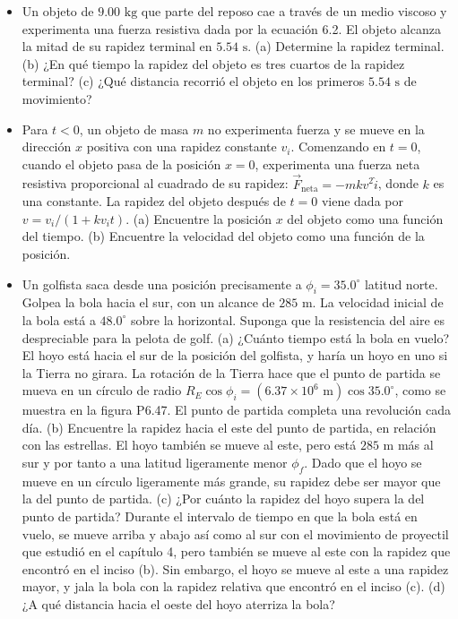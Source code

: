 \documentclass[11pt,a4paper]{article}
\begin{document}
\begin{itemize}
    \item[\textbf{45.}] Un objeto de $9.00 \text{ kg}$ que parte del reposo cae a través de un medio viscoso y experimenta una fuerza resistiva dada por la ecuación 6.2. El objeto alcanza la mitad de su rapidez terminal en $5.54 \text{ s}$. (a) Determine la rapidez terminal. (b) ¿En qué tiempo la rapidez del objeto es tres cuartos de la rapidez terminal? (c) ¿Qué distancia recorrió el objeto en los primeros $5.54 \text{ s}$ de movimiento?
    \vspace*{8cm}

    \item[\textbf{46.}] Para $t < 0$, un objeto de masa $m$ no experimenta fuerza y se mueve en la dirección $x$ positiva con una rapidez constante $v_i$. Comenzando en $t = 0$, cuando el objeto pasa de la posición $x = 0$, experimenta una fuerza neta resistiva proporcional al cuadrado de su rapidez: $\vec{F}_{\text{neta}} = -mkv^2 \hat{i}$, donde $k$ es una constante. La rapidez del objeto después de $t = 0$ viene dada por $v = v_i / (1 + kv_it)$. (a) Encuentre la posición $x$ del objeto como una función del tiempo. (b) Encuentre la velocidad del objeto como una función de la posición.
    \vspace*{7cm}

    \item[\textbf{47.}] Un golfista saca desde una posición precisamente a $\phi_i = 35.0^\circ$ latitud norte. Golpea la bola hacia el sur, con un alcance de $285 \text{ m}$. La velocidad inicial de la bola está a $48.0^\circ$ sobre la horizontal. Suponga que la resistencia del aire es despreciable para la pelota de golf. (a) ¿Cuánto tiempo está la bola en vuelo? El hoyo está hacia el sur de la posición del golfista, y haría un hoyo en uno si la Tierra no girara. La rotación de la Tierra hace que el punto de partida se mueva en un círculo de radio $R_E \cos\phi_i = (6.37 \times 10^6 \text{ m})\cos 35.0^\circ$, como se muestra en la figura P6.47. El punto de partida completa una revolución cada día. (b) Encuentre la rapidez hacia el este del punto de partida, en relación con las estrellas. El hoyo también se mueve al este, pero está $285 \text{ m}$ más al sur y por tanto a una latitud ligeramente menor $\phi_f$. Dado que el hoyo se mueve en un círculo ligeramente más grande, su rapidez debe ser mayor que la del punto de partida. (c) ¿Por cuánto la rapidez del hoyo supera la del punto de partida? Durante el intervalo de tiempo en que la bola está en vuelo, se mueve arriba y abajo así como al sur con el movimiento de proyectil que estudió en el capítulo 4, pero también se mueve al este con la rapidez que encontró en el inciso (b). Sin embargo, el hoyo se mueve al este a una rapidez mayor, y jala la bola con la rapidez relativa que encontró en el inciso (c). (d) ¿A qué distancia hacia el oeste del hoyo aterriza la bola?
    \vspace*{9cm}
\end{itemize}
\end{document}

